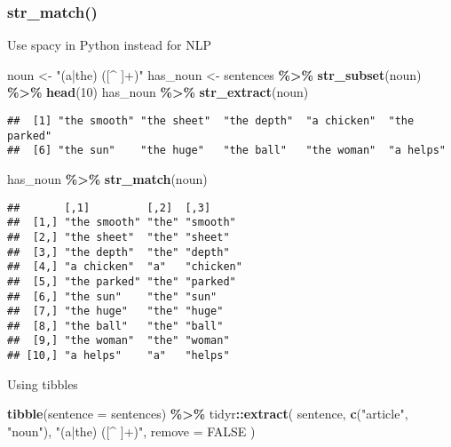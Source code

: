 \documentclass[
]{article}
\newenvironment{Shaded}{\begin{snugshade}}{\end{snugshade}}
\newcommand{\DataTypeTok}[1]{\textcolor[rgb]{0.13,0.29,0.53}{#1}}
\newcommand{\DecValTok}[1]{\textcolor[rgb]{0.00,0.00,0.81}{#1}}
\newcommand{\KeywordTok}[1]{\textcolor[rgb]{0.13,0.29,0.53}{\textbf{#1}}}
\newcommand{\NormalTok}[1]{#1}
\newcommand{\OperatorTok}[1]{\textcolor[rgb]{0.81,0.36,0.00}{\textbf{#1}}}
\newcommand{\OtherTok}[1]{\textcolor[rgb]{0.56,0.35,0.01}{#1}}
\newcommand{\StringTok}[1]{\textcolor[rgb]{0.31,0.60,0.02}{#1}}
\begin{document}
\hypertarget{str_match}{%
\subsubsection{str\_match()}\label{str_match}}

Use spacy in Python instead for NLP

\begin{Shaded}
\begin{Highlighting}[]
\NormalTok{noun \textless{}{-}}\StringTok{ "(a|the) ([\^{} ]+)"}
\NormalTok{has\_noun \textless{}{-}}\StringTok{ }\NormalTok{sentences }\OperatorTok{\%\textgreater{}\%}
\KeywordTok{str\_subset}\NormalTok{(noun) }\OperatorTok{\%\textgreater{}\%}
\KeywordTok{head}\NormalTok{(}\DecValTok{10}\NormalTok{)}
\NormalTok{has\_noun }\OperatorTok{\%\textgreater{}\%}
\KeywordTok{str\_extract}\NormalTok{(noun)}
\end{Highlighting}
\end{Shaded}

\begin{verbatim}
##  [1] "the smooth" "the sheet"  "the depth"  "a chicken"  "the parked"
##  [6] "the sun"    "the huge"   "the ball"   "the woman"  "a helps"
\end{verbatim}

\begin{Shaded}
\begin{Highlighting}[]
\NormalTok{has\_noun }\OperatorTok{\%\textgreater{}\%}
\KeywordTok{str\_match}\NormalTok{(noun)}
\end{Highlighting}
\end{Shaded}

\begin{verbatim}
##       [,1]         [,2]  [,3]     
##  [1,] "the smooth" "the" "smooth" 
##  [2,] "the sheet"  "the" "sheet"  
##  [3,] "the depth"  "the" "depth"  
##  [4,] "a chicken"  "a"   "chicken"
##  [5,] "the parked" "the" "parked" 
##  [6,] "the sun"    "the" "sun"    
##  [7,] "the huge"   "the" "huge"   
##  [8,] "the ball"   "the" "ball"   
##  [9,] "the woman"  "the" "woman"  
## [10,] "a helps"    "a"   "helps"
\end{verbatim}

Using tibbles

\begin{Shaded}
\begin{Highlighting}[]
\KeywordTok{tibble}\NormalTok{(}\DataTypeTok{sentence =}\NormalTok{ sentences) }\OperatorTok{\%\textgreater{}\%}
\NormalTok{tidyr}\OperatorTok{::}\KeywordTok{extract}\NormalTok{(}
\NormalTok{sentence, }\KeywordTok{c}\NormalTok{(}\StringTok{"article"}\NormalTok{, }\StringTok{"noun"}\NormalTok{), }\StringTok{"(a|the) ([\^{} ]+)"}\NormalTok{,}
\DataTypeTok{remove =} \OtherTok{FALSE}
\NormalTok{)}
\end{Highlighting}
\end{Shaded}
\end{document}
